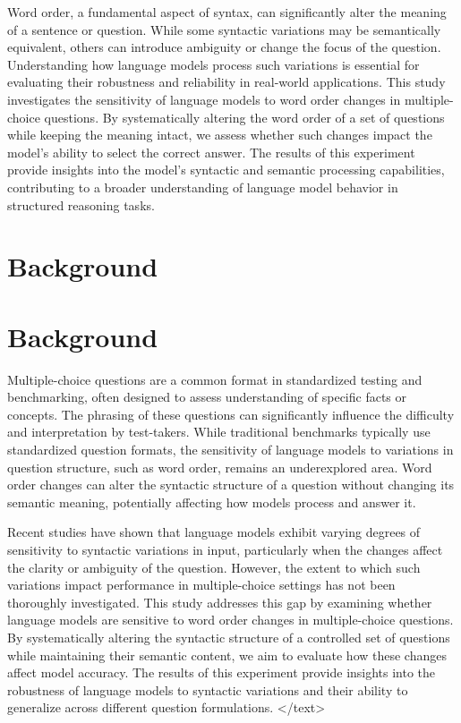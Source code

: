 \documentclass{article}
\begin{document}
Word order, a fundamental aspect of syntax, can significantly alter the meaning of a sentence or question. While some syntactic variations may be semantically equivalent, others can introduce ambiguity or change the focus of the question. Understanding how language models process such variations is essential for evaluating their robustness and reliability in real-world applications. This study investigates the sensitivity of language models to word order changes in multiple-choice questions. By systematically altering the word order of a set of questions while keeping the meaning intact, we assess whether such changes impact the model's ability to select the correct answer. The results of this experiment provide insights into the model's syntactic and semantic processing capabilities, contributing to a broader understanding of language model behavior in structured reasoning tasks.
\section{Background}
\section{Background}

Multiple-choice questions are a common format in standardized testing and benchmarking, often designed to assess understanding of specific facts or concepts. The phrasing of these questions can significantly influence the difficulty and interpretation by test-takers. While traditional benchmarks typically use standardized question formats, the sensitivity of language models to variations in question structure, such as word order, remains an underexplored area. Word order changes can alter the syntactic structure of a question without changing its semantic meaning, potentially affecting how models process and answer it. 

Recent studies have shown that language models exhibit varying degrees of sensitivity to syntactic variations in input, particularly when the changes affect the clarity or ambiguity of the question. However, the extent to which such variations impact performance in multiple-choice settings has not been thoroughly investigated. This study addresses this gap by examining whether language models are sensitive to word order changes in multiple-choice questions. By systematically altering the syntactic structure of a controlled set of questions while maintaining their semantic content, we aim to evaluate how these changes affect model accuracy. The results of this experiment provide insights into the robustness of language models to syntactic variations and their ability to generalize across different question formulations.
</text>
\end{document}
